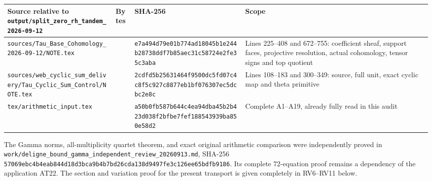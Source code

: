 \documentclass{article}
\begin{document}
{\def\LTcaptype{none} %
\begin{longtable}[]{@{}
  >{\raggedright\arraybackslash}p{}
  >{\raggedleft\arraybackslash}p{}
  >{\raggedright\arraybackslash}p{}
  >{\raggedright\arraybackslash}p{}@{}}
\toprule\noalign{}
\begin{minipage}[b]{\linewidth}\raggedright
Source relative to \nolinkurl{output/split_zero_rh_tandem_2026-09-12}
\end{minipage} & \begin{minipage}[b]{\linewidth}\raggedleft
Bytes
\end{minipage} & \begin{minipage}[b]{\linewidth}\raggedright
SHA-256
\end{minipage} & \begin{minipage}[b]{\linewidth}\raggedright
Scope
\end{minipage} \\
\midrule\noalign{}
\endhead
\bottomrule\noalign{}
\endlastfoot
\nolinkurl{sources/Tau_Base_Cohomology_2026-09-12/NOTE.tex} & 28353 & \nolinkurl{e7a494d79e01b774ad18045b1e244b28738ddf7b85aec31c58724e2fe35c3aba} & Lines 225--408 and 672--755: coefficient sheaf, support faces, projective resolution, actual cohomology, tensor signs and top quotient \\
\nolinkurl{sources/web_cyclic_sum_delivery/Tau_Cyclic_Sum_Control/NOTE.tex} & 41804 & \nolinkurl{2cdfd5b25631464f9500dc5fd07c4c8f5c927c8877eb1bf076307ec5dcbc2e8c} & Lines 108--183 and 300--349: source, full unit, exact cyclic map and theta primitive \\
\nolinkurl{tex/arithmetic_input.tex} & 14644 & \nolinkurl{a50b0fb587b644c4ea94dba45b2b423d038f2bfbe7fef188543939ba850e58d2} & Complete A1--A19, already fully read in this audit \\
\end{longtable}
}

The Gamma norms, all-multiplicity quartet theorem, and exact original arithmetic comparison were independently proved in \nolinkurl{work/deligne_bound_gamma_independent_review_20260913.md}, SHA-256 \nolinkurl{57069ebc4b4eab844d18d3bca9b4b7bd26cda138d9497fe3c126ee65bdfb9186}. Its complete 72-equation proof remains a dependency of the application AT22. The section and variation proof for the present transport is given completely in RV6--RV11 below.
\end{document}

